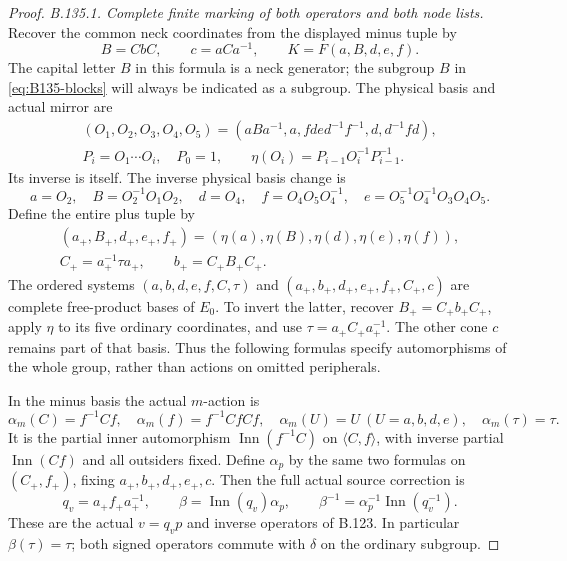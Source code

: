 \begin{proof}
\emph{B.135.1. Complete finite marking of both operators and both node lists.}
Recover the common neck coordinates from the displayed minus tuple by
\[
 B=CbC,\qquad c=aCa^{-1},\qquad K=F(a,B,d,e,f).
\]
The capital letter $B$ in this formula is a neck generator; the subgroup
$B$ in \eqref{eq:B135-blocks} will always be indicated as a subgroup.
The physical basis and actual mirror are
\begin{equation}\label{eq:B135-mirror}
 \begin{gathered}
 (O_1,O_2,O_3,O_4,O_5)
 =(aBa^{-1},a,fde d^{-1}f^{-1},d,d^{-1}fd),\\
 P_i=O_1\cdots O_i,\quad P_0=1,\qquad
 \eta(O_i)=P_{i-1}O_i^{-1}P_{i-1}^{-1}.
 \end{gathered}
\end{equation}
Its inverse is itself. The inverse physical basis change is
\[
 a=O_2,\quad B=O_2^{-1}O_1O_2,\quad d=O_4,\quad
 f=O_4O_5O_4^{-1},\quad e=O_5^{-1}O_4^{-1}O_3O_4O_5.
\]
Define the entire plus tuple by
\begin{equation}\label{eq:B135-plus-tuple}
 \begin{gathered}
 (a_+,B_+,d_+,e_+,f_+)
       =(\eta(a),\eta(B),\eta(d),\eta(e),\eta(f)),\\
 C_+=a_+^{-1}\tau a_+,\qquad b_+=C_+B_+C_+.
 \end{gathered}
\end{equation}
The ordered systems $(a,b,d,e,f,C,\tau)$ and
$(a_+,b_+,d_+,e_+,f_+,C_+,c)$ are complete free-product bases
of $E_0$. To invert the latter, recover $B_+=C_+b_+C_+$,
apply $\eta$ to its five ordinary coordinates, and use
$\tau=a_+C_+a_+^{-1}$. The other cone $c$ remains part of
that basis. Thus the following formulas specify automorphisms
of the whole group, rather than actions on omitted peripherals.

In the minus basis the actual $m$-action is
\begin{equation}\label{eq:B135-m-action}
 \alpha_m(C)=f^{-1}Cf,\quad
 \alpha_m(f)=f^{-1}CfCf,\quad
 \alpha_m(U)=U\ (U=a,b,d,e),\quad \alpha_m(\tau)=\tau.
\end{equation}
It is the partial inner automorphism $\operatorname{Inn}(f^{-1}C)$
on $\langle C,f\rangle$, with inverse partial
$\operatorname{Inn}(Cf)$ and all outsiders fixed.
Define $\alpha_p$ by the same two formulas on
$(C_+,f_+)$, fixing $a_+,b_+,d_+,e_+,c$.
Then the full actual source correction is
\begin{equation}\label{eq:B135-beta}
 q_v=a_+f_+a_+^{-1},\qquad
 \beta=\operatorname{Inn}(q_v)\alpha_p,\qquad
 \beta^{-1}=\alpha_p^{-1}\operatorname{Inn}(q_v^{-1}).
\end{equation}
These are the actual $v=q_vp$ and inverse operators of B.123.
In particular $\beta(\tau)=\tau$; both signed operators
commute with $\delta$ on the ordinary subgroup.


\end{proof}
